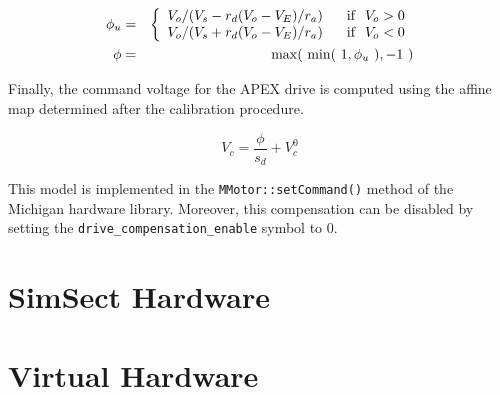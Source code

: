 \begin{eqnarray*}
\phi_u & = &\left\{\begin{array}{ll}
V_o / ( V_s - r_d(V_o - V_E)/r_a)
& \text{\hspace{0.1in}if\hspace{0.1in}}V_o > 0 \\
V_o / ( V_s + r_d(V_o - V_E)/r_a)
& \text{\hspace{0.1in}if\hspace{0.1in}}V_o < 0
\end{array}\right. \\
\phi & = & \mathrm{max}(\ \mathrm{min}(\ 1, \phi_u\ ), -1\ )
\end{eqnarray*}

Finally, the command voltage for the APEX drive is computed using the affine
map determined after the calibration procedure.

\begin{equation*}
V_c = \frac{\phi}{s_d}  + V_c^0
\end{equation*}

This model is implemented in the {\tt MMotor::setCommand()} method of the
Michigan hardware library. Moreover, this compensation can be disabled by
setting the {\tt drive\_compensation\_enable} symbol to 0.
\section{SimSect Hardware}

\section{Virtual Hardware}
